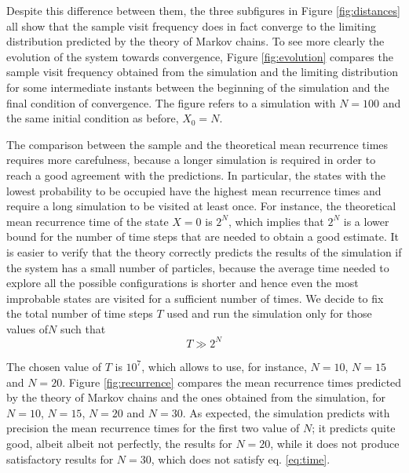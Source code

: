 Despite this difference between them, the three subfigures in Figure \ref{fig:distances} all show that the sample visit frequency does in fact converge to the limiting distribution predicted by the theory of Markov chains. To see more clearly the evolution of the system towards convergence, Figure \ref{fig:evolution} compares the sample visit frequency obtained from the simulation and the limiting distribution for some intermediate instants between the beginning of the simulation and the final condition of convergence. The figure refers to a simulation with $N = 100$ and the same initial condition as before, \ie $X_0 = N$. 

\medskip
The comparison between the sample and the theoretical mean recurrence times requires more carefulness, because a longer simulation is required in order to reach a good agreement with the predictions. In particular, the states with the lowest probability to be occupied have the highest mean recurrence times and require a long simulation to be visited at least once. For instance, the theoretical mean recurrence time of the state $X= 0$ is $2^N$, which implies that $2^N$ is a lower bound for the number of time steps that are needed to obtain a good estimate. It is easier to verify that the theory correctly predicts the results of the simulation if the system has a small number of particles, because the average time needed to explore all the possible configurations is shorter and hence even the most improbable states are visited for a sufficient number of times. We decide to fix the total number of time steps $T$ used and run the simulation only for those values of$N$ such that
\begin{equation}\label{eq:time}
  T \gg 2^N
\end{equation}

The chosen value of $T$ is $10^7$, which allows to use, for instance, $N= 10$, $N= 15$ and $N= 20$.
Figure \ref{fig:recurrence} compares the mean recurrence times predicted by the theory of Markov chains and the ones obtained from the simulation, for $N= 10$, $N= 15$, $N= 20$ and $N= 30$. As expected, the simulation predicts with precision the mean recurrence times for the first two value of $N$; it predicts quite good, albeit albeit not perfectly, the results for $N = 20$, while it does not produce satisfactory results for $N= 30$, which does not satisfy eq. \ref{eq:time}.

